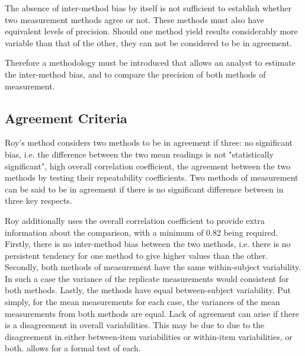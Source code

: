 \documentclass[12pt, a4paper]{report}
\begin{document}
	\noindent The absence of inter-method bias by itself is not
	sufficient to establish whether two measurement methods agree or
	not. These methods must also have equivalent levels of precision.
	Should one method yield results considerably more variable than
	that of the other, they can not be considered to be in agreement.
	
	Therefore a methodology must be introduced that allows an analyst
	to estimate the inter-method bias, and to compare the precision of
	both methods of measurement.
	
	
	\subsection{Agreement Criteria}	
	Roy's method considers two methods to be in agreement if three: no significant bias, i.e. the difference between the two mean readings is not "statistically significant", high overall correlation coefficient, the agreement between the two methods by testing their
	repeatability coefficients. Two methods of measurement can be said to be in agreement if there is no significant difference between in three key respects. 
	
	Roy additionally uses the overall correlation coefficient to provide extra information about the comparison, with a minimum of 0.82 being required. Firstly, there is no inter-method bias between the two methods, i.e. there is no persistent tendency for one method to give higher values than the other. Secondly, both methods of measurement have the same  within-subject variability. In such a case the variance of the replicate measurements would consistent for both methods. Lastly, the methods have equal between-subject variability.  Put simply, for the mean measurements for each case, the variances of the mean measurements from both methods are equal. Lack of agreement can arise if there is a disagreement in overall variabilities. This may be due to due to the disagreement in either between-item variabilities or within-item variabilities, or both. \citet{ARoy2009} allows for a formal test of each.
	
\end{document}
